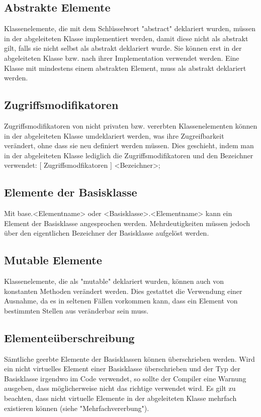 \subsection{Abstrakte Elemente}
Klassenelemente, die mit dem Schlüsselwort "abstract" deklariert wurden, müssen in der abgeleiteten Klasse implementiert werden,
damit diese nicht als abstrakt gilt, falls sie nicht selbst als abstrakt deklariert wurde.
Sie können erst in der abgeleiteten Klasse bzw. nach ihrer Implementation verwendet werden.
Eine Klasse mit mindestens einem abstrakten Element, muss als abstrakt deklariert werden.

\subsection{Zugriffsmodifikatoren}
Zugriffsmodifikatoren von nicht privaten bzw. vererbten Klassenelementen können in der abgeleiteten Klasse umdeklariert werden,
was ihre Zugreifbarkeit verändert, ohne dass sie neu definiert werden müssen.
Dies geschieht, indem man in der abgeleiteten Klasse lediglich die Zugriffsmodifikatoren und den Bezeichner verwendet:
[ Zugriffsmodfikatoren ] <Bezeichner>;

\subsection{Elemente der Basisklasse}
Mit base.<Elementname> oder <Basisklasse>.<Elementname> kann ein Element der Basisklasse angesprochen werden.
Mehrdeutigkeiten müssen jedoch über den eigentlichen Bezeichner der Basisklasse aufgelöst werden.

\subsection{Mutable Elemente}
Klassenelemente, die als "mutable" deklariert wurden, können auch von konstanten Methoden verändert werden. Dies gestattet die
Verwendung einer Ausnahme, da es in seltenen Fällen vorkommen kann, dass ein Element von bestimmten Stellen aus veränderbar sein
muss.

\subsection{Elementeüberschreibung}
Sämtliche geerbte Elemente der Basisklassen können überschrieben werden.
Wird ein nicht virtuelles Element einer Basisklasse überschrieben und der Typ der Basisklasse irgendwo im Code verwendet, so sollte
der Compiler eine Warnung ausgeben, dass möglicherweise nicht das richtige verwendet wird.
Es gilt zu beachten, dass nicht virtuelle Elemente in der abgeleiteten Klasse mehrfach existieren können (siehe "Mehrfachvererbung").


